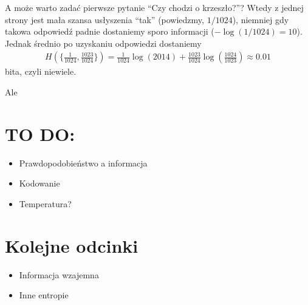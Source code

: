 \documentclass[10pt,a4paper]{article}
\begin{document}
A może warto zadać pierwsze pytanie ``Czy chodzi o krzeszło?''? Wtedy z jednej strony jest mała szansa usłyszenia ``tak'' (powiedzmy, $1/1024$), niemniej gdy takowa odpowiedź padnie dostaniemy sporo informacji  ($-\log(1/1024)=10$). Jednak średnio po uzyskaniu odpowiedzi dostaniemy
\begin{align}
    H(\{ \tfrac{1}{1024},\tfrac{1023}{1024}\}) = \tfrac{1}{1024} \log(2014) + \tfrac{1023}{1024} \log(\tfrac{1024}{1023}) \approx 0.01
\end{align}
bita, czyli niewiele.


Ale 

\section{TO DO:}

\begin{itemize}
    \item Prawdopodobieństwo a informacja
    \item Kodowanie
    \item Temperatura?
\end{itemize}

\section{Kolejne odcinki}

\begin{itemize}
    \item Informacja wzajemna
    \item Inne entropie
\end{itemize}


\end{document}
